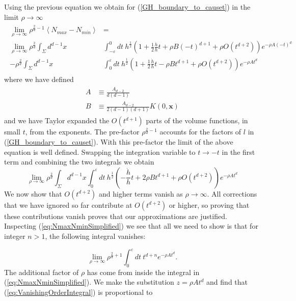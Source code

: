 \documentclass[12pt]{article}
\newcommand{\be}{\begin{equation}}
\newcommand{\ee}{\end{equation}}
\begin{document}
Using the previous equation we obtain for (\ref{GH_boundary_to_causet}) in the limit $\rho \rightarrow \infty$
\begin{gather}\label{eq:NmaxNminStart}
\begin{aligned}
\lim_{\rho \to \infty}\rho^{\frac{2}{d}-1}\left\langle N_{max}-N_{min} \right\rangle &= \\
\lim_{\rho \to \infty}\rho^{\frac{2}{d}}
\int_{\Sigma}d^{d-1}x & \int_{-\varepsilon}^{0}dt\
h^{\frac{1}{2}}\left(1+
\frac{1}{2}\frac{\dot{h}}{h}t+\rho B(-t)^{d+1}+\rho O(t^{d+2})\right)e^{-\rho A(-t)^{d}} \\
-\rho^{\frac{2}{d}}\int_{\Sigma}d^{d-1}x &
\int_{0}^{\varepsilon}dt\
h^{\frac{1}{2}}\left(1+
\frac{1}{2}\frac{\dot{h}}{h}t-\rho Bt^{d+1}+\rho O(t^{d+2})\right)e^{-\rho At^{d}}
\end{aligned}
\end{gather}
where we have defined
\begin{gather}\label{A_and_B_defn}
\begin{aligned}
A & \equiv \frac{A_{d-2}}{d(d-1)} \\
B & \equiv \frac{A_{d-2}}{2(d-1)(d+1)}K(0,\mathbf{x})
\end{aligned}
\end{gather}
and we have Taylor expanded the $O(t^{d+1})$ parts of the volume functions, in small $t$, from the exponents. The pre-factor $\rho^{\frac{2}{d}-1}$ accounts for the factors of $l$ in (\ref{GH_boundary_to_causet}). With this pre-factor the limit of the above equation is well defined. Swapping the integration variable to $t\rightarrow -t$ in the first term and combining the two integrals we obtain
\be\label{eq:NmaxNminSimplified}
\lim_{\rho \to \infty}\rho^{\frac{2}{d}}
\int_{\Sigma}d^{d-1}x \int_{0}^{\varepsilon}dt\
h^{\frac{1}{2}}\left(-\frac{\dot{h}}{h}t+2\rho B t^{d+1}+\rho O(t^{d+2}) \right)e^{-\rho At^{d}}
\ee
We now show that $O(t^{d+2})$ and higher terms vanish as $\rho \rightarrow\infty$. All corrections that we have ignored so far contribute at $O(t^{d+2})$ or higher, so proving that these contributions vanish proves that our approximations are justified. Inspecting (\ref{eq:NmaxNminSimplified}) we see that all we need to show is that for integer $n>1$,  the following integral vanishes:

\be\label{eq:VanishingOrderIntegral}
\lim_{\rho \to \infty}\rho^{\frac{2}{d}+1}\int_{0}^{\varepsilon}dt\
t^{d+n}e^{-\rho At^{d}}.
\ee
The additional factor of $\rho$ has come from inside the integral in (\ref{eq:NmaxNminSimplified}). We make the substitution $z=\rho At^{d}$ and find that (\ref{eq:VanishingOrderIntegral}) is proportional to
\end{document}
